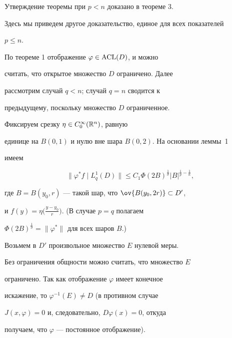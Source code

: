 \begin{pf}


Утверждение теоремы при $p<n$ доказано в теореме 3.


Здесь мы приведем другое доказательство, единое для всех показателей


$p\leq n$.











По теореме 1 отображение $\varphi\in\operatorname{ACL}(D)$, и можно


считать, что открытое множество $D$ ограничено. Далее


рассмотрим случай $q<n$; случай $q=n$ сводится к


предыдущему, поскольку множество $D$ ограниченное.





Фиксируем срезку $\eta\in C_{0}^{\infty}({\Bbb R}^n)$, равную


единице на $B(0,1)$ и нулю вне шара $B(0,2)$. На основании леммы~1


имеем


$$


\|\varphi^{\ast}f\mid L^1_q(D)\| \leq


C_1{\Phi(2B)}^{\frac{1}{\sigma}} |B|^{\frac{1}{p} - \frac{1}{n}},


$$


где $B=B(y_0,r)$ --- такой шар, что $\ov{B(y_0,2r)}\subset D'$,


и $f(y)=\eta\big(\frac{y-y_0}{r}\big)$. (В случае $p=q$ полагаем


$\Phi(2B)^{\frac{1}{\sigma}}=\|\varphi^{\ast}\|$ для всех шаров $B$.)


Возьмем в $D'$ произвольное множество $E$ нулевой меры.


Без ограничения общности можно считать, что множество $E$


ограничено. Так как отображение $\varphi$ имеет конечное


искажение, то $\varphi^{-1}(E)\ne D$ (в противном случае


$J(x,\varphi)=0$ и, следовательно, $D\varphi(x)=0$, откуда


получаем, что $\varphi$ --- постоянное отображение).



\end{pf}
